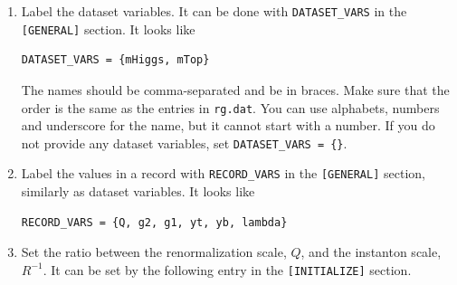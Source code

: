 \documentclass[12pt]{article}
\begin{document}
\begin{enumerate}
\begin{lstlisting}[basicstyle=\ttfamily\footnotesize, frame=single]
[DATASET] (1.20000e+02 1.70000e+02)
2.40000e+02 6.45699e-01 4.62621e-01 9.00513e-01 ... 
3.80374e+02 6.43314e-01 4.63832e-01 8.78139e-01 ... 
...
[DATASET] (1.20000e+02 1.70200e+02)
...
\end{lstlisting}
       The statement of \verb|[DATASET]| indicates the beginning
       of a ``dataset''. The numbers in parentheses are ``dataset
       variables'', which are optional common variables for the
       dataset. If you do not provide any dataset variables, you can omit
       the parentheses and just
       \verb|[DATASET]| is enough. Each row below the \verb|[DATASET]|
       statement is a ``record'' that belongs to the dataset. A record
       should contain information about the renormalization scale and
       the values of coupling constants at the scale. The dataset ends
       when it reaches the end of file or a new \verb|[DATASET]|
       statement. You may use several formats for numbers like
       \verb|1|, \verb|1.2|, \verb|1.23e10| and \verb|2.E-10|.  If you
       want to use different delimiters, modify
       \verb|DATASET_DELIM| and \verb|RECORD_DELIM| in the \verb|[GENERAL]|
       section.
 \item Label the dataset variables. It can be done with
       \verb|DATASET_VARS| in the \verb|[GENERAL]| section.
       It looks like
\begin{lstlisting}[basicstyle=\ttfamily\footnotesize, frame=single]
DATASET_VARS = {mHiggs, mTop}
\end{lstlisting}
       The names should be comma-separated and be in braces.  Make
       sure that the order is the same as the entries in \verb|rg.dat|.
       You can use alphabets, numbers and underscore for the name, but
       it cannot start with a number. If you do not provide any dataset
       variables, set \verb|DATASET_VARS = {}|.
 \item Label the values in a record with
       \verb|RECORD_VARS| in the \verb|[GENERAL]| section, similarly as
       dataset variables. It looks like
\begin{lstlisting}[basicstyle=\ttfamily\footnotesize, frame=single]
RECORD_VARS = {Q, g2, g1, yt, yb, lambda}
\end{lstlisting}
 \item Set the ratio between the renormalization scale, $Q$, and the
       instanton scale, $R^{-1}$. It can be set by the following entry
       in the \verb|[INITIALIZE]| section.
\begin{lstlisting}[basicstyle=\ttfamily\footnotesize, frame=single]

\end{lstlisting}
\end{enumerate}
\end{document}
